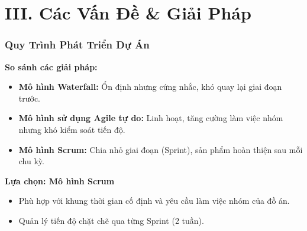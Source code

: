 \section{III. Các Vấn Đề \& Giải Pháp}

\begin{frame}
\frametitle{Quy Trình Phát Triển Dự Án}
\textbf{So sánh các giải pháp:}
\begin{itemize}
    \item \textbf{Mô hình Waterfall:} Ổn định nhưng cứng nhắc, khó quay lại giai đoạn trước.
    \item \textbf{Mô hình sử dụng Agile tự do:} Linh hoạt, tăng cường làm việc nhóm nhưng khó kiểm soát tiến độ.
    \item \textbf{Mô hình Scrum:} Chia nhỏ giai đoạn (Sprint), sản phẩm hoàn thiện sau mỗi chu kỳ.
\end{itemize}
\vspace{0.5cm}
\textbf{Lựa chọn: Mô hình Scrum}
\begin{itemize}
    \item Phù hợp với khung thời gian cố định và yêu cầu làm việc nhóm của đồ án.
    \item Quản lý tiến độ chặt chẽ qua từng Sprint (2 tuần).
\end{itemize}
\end{frame}

